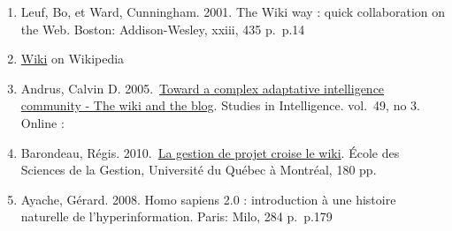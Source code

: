 \begin{enumerate}
\def\labelenumi{\arabic{enumi}.}
\item
  Leuf, Bo, et Ward, Cunningham. 2001. The Wiki way : quick
  collaboration on the Web. Boston: Addison-Wesley, xxiii, 435 p.~p.14
\item
  \href{http://en.wikipedia.org/wiki/Wiki}{Wiki} on Wikipedia
\item
  Andrus, Calvin D. 2005.~\href{http://ssrn.com/abstract=755904}{Toward
  a complex adaptative intelligence community - The wiki and the blog}.
  Studies in Intelligence. vol.~49, no 3. Online :
\item
  Barondeau, Régis.
  2010.~\href{http://www.regisbarondeau.com/Chapitre+4\%3A+Analyse+du+cas\#Synth_se}{La
  gestion de projet croise le wiki}. École des Sciences de la Gestion,
  Université du Québec à Montréal, 180 pp.
\item
  Ayache, Gérard. 2008. Homo sapiens 2.0 : introduction à une histoire
  naturelle de l'hyperinformation. Paris: Milo, 284 p.~p.179
\end{enumerate}
